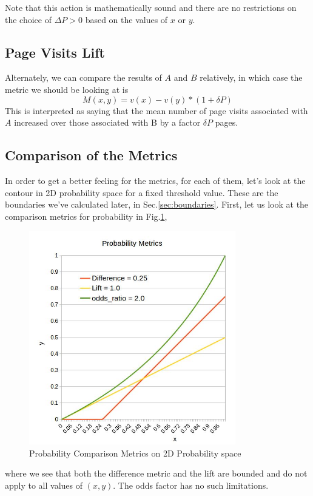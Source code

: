 \documentclass[12pt]{report}
\newcommand{\beq}{\begin{equation}} %
\newcommand{\eeq}{\end{equation}} %
\begin{document}
Note that this action is mathematically sound and there are no restrictions on
the choice of \(\Delta P >0\) based on the values of \(x\) or \(y\).

\subsection{Page Visits Lift}\label{sec:vlift}
Alternately, we can compare the results of \(A\) and \(B\) relatively,
in which case the metric we should be looking at is
\beq
\label{eq:visitslift}
M(x,y) = v(x) - v(y)*(1+\delta P)
\eeq
This is interpreted as saying that the mean number of page visits
associated with \(A\) increased over those associated with B by a
factor \(\delta P\) pages.


\subsection{Comparison of the Metrics}
In order to get a better feeling for the metrics, for each of them,
let's look at the contour in 2D probability space for a fixed
threshold value. These are the boundaries we've calculated later, in
Sec.\ref{sec:boundaries}. First, let us look at the comparison metrics
for probability in Fig.\ref{fig:probmetrics},
\begin{figure}[ht!]
\centering
\includegraphics[width=90mm]{figures/probability_metrics}
\caption{Probability Comparison Metrics on 2D Probability
  space \label{fig:probmetrics}}
\end{figure}
where we see that both the difference metric and the lift are bounded
and do not apply to all values of \((x,y)\). The odds factor has no
such limitations.
\end{document}
